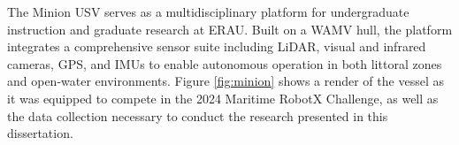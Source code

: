 \documentclass{erauthesis}
\begin{document}





The Minion \ac{USV} serves as a multidisciplinary platform for undergraduate instruction and graduate research at \ac{ERAU}.
Built on a \ac{WAMV} hull, the platform integrates a comprehensive sensor suite including \ac{LiDAR}, visual and infrared cameras, \ac{GPS}, and \acp{IMU} to enable autonomous operation in both littoral zones and open-water environments.
Figure \ref{fig:minion} shows a render of the vessel as it was equipped to compete in the 2024 Maritime RobotX Challenge, as well as the data collection necessary to conduct the research presented in this dissertation.
\end{document}
